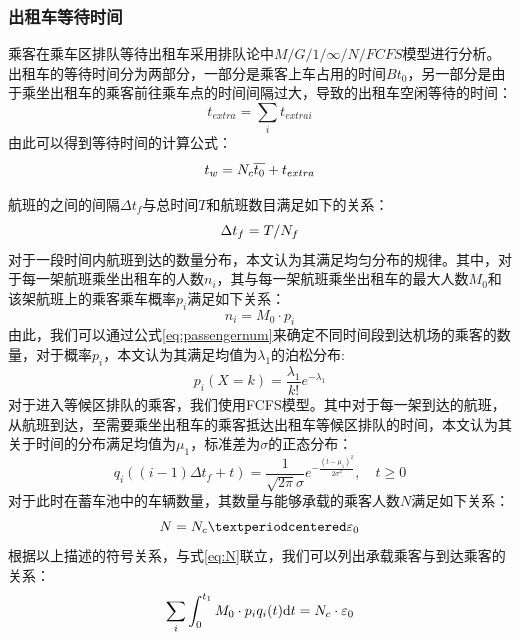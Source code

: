 \documentclass{cumcm}
\begin{document}
\subsubsection{出租车等待时间}
乘客在乘车区排队等待出租车采用排队论中$M/G/1/\infty/N/FCFS$模型进行分析。出租车的等待时间分为两部分，一部分是乘客上车占用的时间$Bt_0$，另一部分是由于乘坐出租车的乘客前往乘车点的时间间隔过大，导致的出租车空闲等待的时间：
\begin{equation}
	t_{extra}=\sum_it_{extrai}
	\label{eq:textrafunc}
\end{equation}
由此可以得到等待时间\waittime 的计算公式：
\begin{equation}
	\mbox{$t_w$}=\mbox{$N_c$}\overline{t_0}+t_{extra}
	\label{eq:tfunc}
\end{equation}
\par
航班的之间的间隔$\Delta t_f$与总时间$T$和航班数目\flightnum 满足如下的关系：
\begin{equation}
	\Delta t_f=T/\mbox{$N_f$}
	\label{eq:deltatf}
\end{equation}
对于一段时间内航班到达的数量分布，本文认为其满足均匀分布的规律。其中，对于每一架航班乘坐出租车的人数$n_i$，其与每一架航班乘坐出租车的最大人数$M_0$和该架航班上的乘客乘车概率$p_i$满足如下关系：
\begin{equation}
	n_i=M_0·p_i
	\label{eq:passengernum}
\end{equation}
由此，我们可以通过公式\ref{eq:passengernum}来确定不同时间段到达机场的乘客的数量，对于概率$p_i$，本文认为其满足均值为$\lambda_1$的泊松分布:
\begin{equation}
	p_i(X=k)=\frac{\lambda_1}{k!}e^{-\lambda_1}
	\label{eq:pi}
\end{equation}
对于进入等候区排队的乘客，我们使用FCFS模型。其中对于每一架到达的航班，从航班到达，至需要乘坐出租车的乘客抵达出租车等候区排队的时间，本文认为其关于时间的分布满足均值为$\mu_1$，标准差为$\sigma$的正态分布：
\begin{equation}
	q_i((i-1)\Delta t_f+t)=\frac{1}{\sqrt{2\pi}\sigma}e^{-\frac{(t-\mu_1)^2}{2\sigma^2}},\quad t\ge0
	\label{eq:qi}
\end{equation}
对于此时在蓄车池中的车辆数量，其数量\taxinum 与能够承载的乘客人数$N$满足如下关系：
\begin{equation}
	N=\mbox{\taxinum}·\varepsilon_0
	\label{eq:N}
\end{equation}
根据以上描述的符号关系，与式\ref{eq:N}联立，我们可以列出承载乘客与到达乘客的关系：
\begin{equation}
	\sum_i\int_0^{t_1}M_0\cdot p_iq_i(t)\mathrm{d}t=\mbox{$N_c$}\cdot\varepsilon_0
\end{equation}
\end{document}
